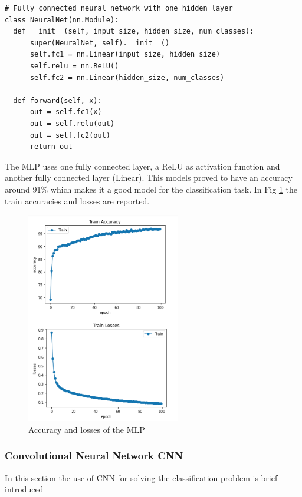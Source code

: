 \documentclass[a4paper,12pt]{article}
\begin{document}
\begin{Verbatim}[fontsize=\small]
# Fully connected neural network with one hidden layer
class NeuralNet(nn.Module):
  def __init__(self, input_size, hidden_size, num_classes):
      super(NeuralNet, self).__init__()
      self.fc1 = nn.Linear(input_size, hidden_size) 
      self.relu = nn.ReLU()
      self.fc2 = nn.Linear(hidden_size, num_classes)  
  
  def forward(self, x):
      out = self.fc1(x)
      out = self.relu(out)
      out = self.fc2(out)
      return out
\end{Verbatim}

\noindent The MLP uses one fully connected layer, a ReLU as activation function and another fully connected layer (Linear). This models proved to have an accuracy around 91\% which makes it a good model for the classification task. In Fig \ref{fig:anntrain} the train accuracies and losses are reported.

\begin{figure}[H]
  \begin{center}
  \includegraphics[width=0.6\textwidth]{images/ann_train.png}
  \end{center}
  \caption{Accuracy and losses of the MLP}
  \label{fig:anntrain}
\end{figure}

\subsubsection{Convolutional Neural Network CNN}
In this section the use of CNN for solving the classification problem is brief introduced 
\end{document}
